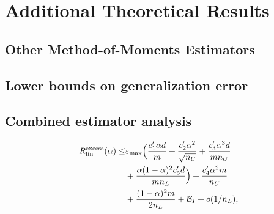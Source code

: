 \section{Additional Theoretical Results}



\subsection{Other Method-of-Moments Estimators}



\subsection{Lower bounds on generalization error}



\subsection{Combined estimator analysis}


\begin{align}
    R_{\mathrm{lin}}^{\mathrm{excess}}(\alpha)\le & \varepsilon_{\max}\Big(\frac{c'_1 \alpha d }{m} + \frac{c'_2 \alpha^2 }{\sqrt{n_U}} + \frac{c'_3 \alpha^3 d}{m n_U} \\
    &+ \frac{\alpha (1 - \alpha)^2 c'_5 d}{m n_L} \Big) + \frac{c'_4 \alpha^2 m}{n_U} \nonumber \\
    &+ \frac{(1 - \alpha)^2 m}{2n_L} + \mathcal{B}_I + o(1/n_L), \nonumber
\end{align}